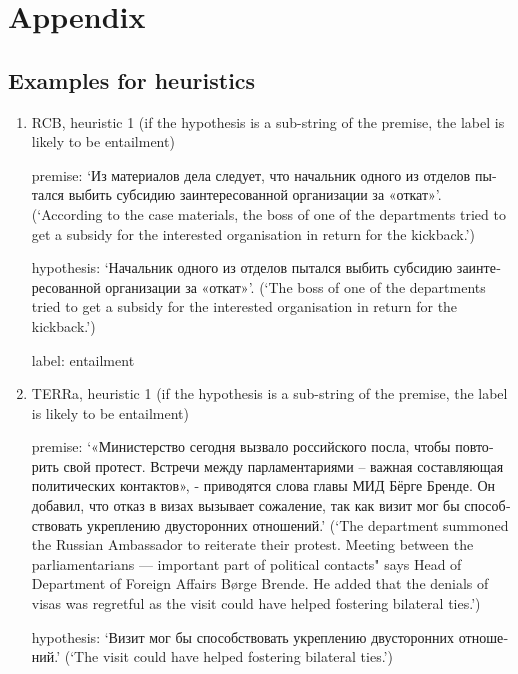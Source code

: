 \documentclass[11pt]{article}
\begin{document}




\section*{Appendix}

\subsection{Examples for heuristics}
\label{examples}
\begin{enumerate}
    \item RCB, heuristic 1 (if the hypothesis is a sub-string of the premise, the label is likely to be entailment)

premise: \foreignlanguage{russian}{`Из материалов дела следует, что начальник одного из отделов пытался выбить субсидию заинтересованной организации за «откат»'.}(`According to the case materials, the boss of one of the departments tried to get a subsidy for the interested organisation in return for the kickback.')

hypothesis: \foreignlanguage{russian}{`Начальник одного из отделов пытался выбить субсидию заинтересованной организации за «откат»'.} (`The boss of one of the departments tried to get a subsidy for the interested organisation in return for the kickback.')

label: entailment

    \item TERRa, heuristic 1 (if the hypothesis is a sub-string of the premise, the label is likely to be entailment)
    
premise: \foreignlanguage{russian}{`«Министерство сегодня вызвало российского посла, чтобы повторить свой протест. Встречи между парламентариями – важная составляющая политических контактов», - приводятся слова главы МИД Бёрге Бренде. Он добавил, что отказ в визах вызывает сожаление, так как визит мог бы способствовать укреплению двусторонних отношений.'} (`The department summoned the Russian Ambassador to reiterate their protest. Meeting between the parliamentarians --- important part of political contacts" says Head of Department of Foreign Affairs Børge Brende. He added that the denials of visas was regretful as the visit could have helped fostering bilateral ties.')

hypothesis: \foreignlanguage{russian}{`Визит мог бы способствовать укреплению двусторонних отношений.'} (`The visit could have helped fostering bilateral ties.')


\end{enumerate}
\end{document}
